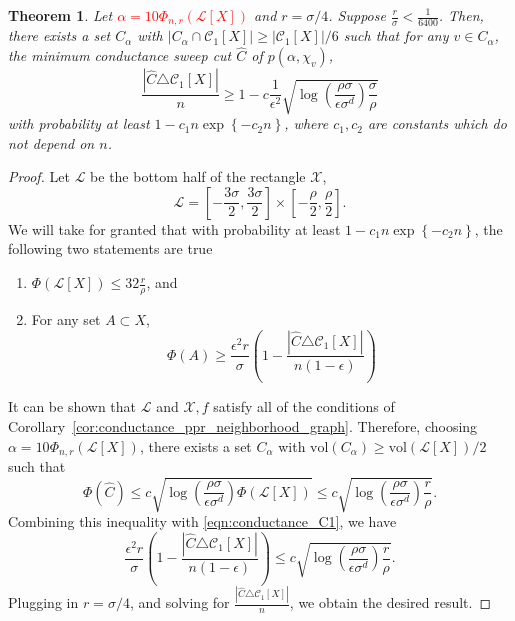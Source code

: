 \documentclass{article}
\newcommand{\abs}[1]{\left \lvert #1 \right \rvert}
\newcommand{\vol}{\mathrm{vol}}
\newcommand{\set}[1]{\left\{#1\right\}}
\newcommand{\1}{\mathbf{1}}
\theoremstyle{alden}
\theoremstyle{aldenthm}
\newtheorem{theorem}{Theorem}
\theoremstyle{remark}
\begin{document}
\begin{theorem}
	Let \textcolor{red}{$\alpha = 10 \Phi_{n,r}(\mathcal{L}[X])$} and $r = \sigma/4$. Suppose $\frac{r}{\sigma} < \frac{1}{6400}$. Then, there exists a set $C_{\alpha}$ with $\abs{C_{\alpha} \cap \mathcal{C}_1[X]} \geq \abs{\mathcal{C}_1[X]}/6$ such that for any $v \in C_{\alpha}$, the minimum conductance sweep cut $\widehat{C}$ of $p(\alpha,\chi_v)$,
	\begin{equation*}
	\frac{\abs{\widehat{C} \triangle \mathcal{C}_1[X]}}{n} \geq 1 - c \frac{1}{\epsilon^2} \sqrt{\log\left(\frac{\rho \sigma}{\epsilon\sigma^d}\right)\frac{\sigma}{\rho}}
	\end{equation*}
	with probability at least $1 - c_1 n \exp\set{-c_2n}$, where $c_1,c_2$ are constants which do not depend on $n$.
\end{theorem}
\begin{proof}
	Let $\mathcal{L}$ be the bottom half of the rectangle $\mathcal{X}$,
	\begin{equation*}
	\mathcal{L} = \left[-\frac{3\sigma}{2}, \frac{3\sigma}{2}\right] \times \left[-\frac{\rho}{2},\frac{\rho}{2}\right].
	\end{equation*}
	We will take for granted that with probability at least $1 - c_1 n \exp\set{-c_2n}$, the following two statements are true
	\begin{enumerate}
		\item $\Phi(\mathcal{L}[X]) \leq 32 \frac{r}{\rho}$, and
		\item For any set $A \subset X$,
		\begin{equation}
		\label{eqn:conductance_C1}
		\Phi(A) \geq \frac{\epsilon^2 r}{\sigma}\left(1 - \frac{\abs{\widehat{C} \triangle \mathcal{C}_1[X]}}{n(1 - \epsilon)}\right)
		\end{equation}
	\end{enumerate}
	It can be shown that $\mathcal{L}$ and $\mathcal{X},f$ satisfy all of the conditions of Corollary~\ref{cor:conductance_ppr_neighborhood_graph}. Therefore, choosing $\alpha = 10 \Phi_{n,r}(\mathcal{L}[X])$, there exists a set $C_{\alpha}$ with $\vol(C_{\alpha}) \geq \vol(\mathcal{L}[X])/2$ such that 
	\begin{equation*}
	\Phi(\widehat{C}) \leq c \sqrt{\log\left(\frac{\rho \sigma}{\epsilon\sigma^d}\right) \Phi(\mathcal{L}[X])} \leq c \sqrt{\log\left(\frac{\rho \sigma}{\epsilon\sigma^d}\right) \frac{r}{\rho}}.
	\end{equation*}
	Combining this inequality with \eqref{eqn:conductance_C1}, we have
	\begin{equation*}
	\frac{\epsilon^2 r}{\sigma}\left(1 - \frac{\abs{\widehat{C} \triangle \mathcal{C}_1[X]}}{n(1 - \epsilon)}\right) \leq c \sqrt{\log\left(\frac{\rho \sigma}{\epsilon\sigma^d}\right) \frac{r}{\rho}}.
	\end{equation*}
	Plugging in $r = \sigma/4$, and solving for $\frac{\abs{\widehat{C} \triangle \mathcal{C}_1[X]}}{n}$, we obtain the desired result.
\end{proof}
\end{document}
